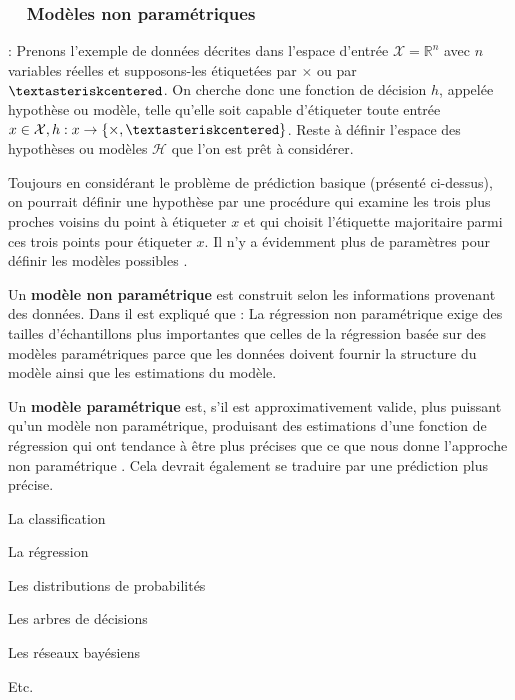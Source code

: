	\subsubsection*{\qquad \textbullet \ \ Modèles non paramétriques} \label{subsec:modelisation-param}
	
	
	\Eg: Prenons l'exemple de données décrites dans l'espace d'entrée $\mathcal{X} = \mathbb{R}^n$ avec $n$ variables réelles et supposons-les étiquetées par $\times$ ou par $\textasteriskcentered$. On cherche donc une fonction de décision $h$, appelée hypothèse ou modèle, telle qu'elle soit capable d'étiqueter toute entrée 
	$x \in \mathcal{X}, h: x \rightarrow \{\times,\textasteriskcentered\}$. Reste à définir l'espace des hypothèses ou modèles $\mathcal{H}$ que l'on est prêt à considérer.
	
	Toujours en considérant le problème de prédiction basique (présenté ci-dessus), on pourrait définir une hypothèse par une procédure qui examine les trois plus proches voisins du point à étiqueter $x$ et qui choisit l'étiquette majoritaire parmi ces trois points pour étiqueter $x$. Il n'y a évidemment plus de paramètres pour définir les modèles possibles \cite{antoine2018apprentissage}.
	
	Un \textbf{modèle non paramétrique} est construit selon les informations provenant des données. Dans \cite{bishop2006pattern, antoine2018apprentissage} il est expliqué que : La régression non paramétrique exige des tailles d'échantillons plus importantes que celles de la régression basée sur des modèles paramétriques parce que les données doivent fournir la structure du modèle ainsi que les estimations du modèle.
	
	Un \textbf{modèle paramétrique} est, s'il est approximativement valide, plus puissant qu'un modèle non paramétrique, produisant des estimations d'une fonction de régression qui ont tendance à être plus précises que ce que nous donne l'approche non paramétrique \cite{matloff2017statistical}. Cela devrait également se traduire par une prédiction plus précise. 
	
	
	
	\begin{list}{--}{Dans \cite{antoine2018apprentissage}, il est expliqué que nous pouvons construire un modèle d'apprentissage, ou l'espaces des hypothèses d'apprentissage, par: }
		\item La classification
		\item La régression
		\item Les distributions de probabilités
		\item Les arbres de décisions
		\item Les réseaux bayésiens 
		\item Etc.
	\end{list}	
	
